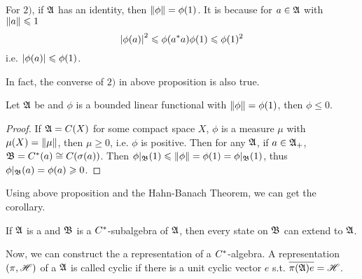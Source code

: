 \documentclass[a4paper,11pt]{report}
\begin{document}
\begin{rem}
	For $2)$, if $\mathfrak{A}$ has an identity, then $\left\lVert\phi\right\lVert = \phi(1)$. It is because for $a \in \mathfrak{A}$ with $\left\lVert a\right\lVert \leqslant 1$
	\begin{equation*}
		\left\lvert\phi(a)\right\lvert^2 \leqslant \phi(a^{*}a)\phi(1) \leqslant \phi(1)^2
	\end{equation*}
	i.e. $\left\lvert\phi(a)\right\lvert \leqslant \phi(1)$.
\end{rem}

In fact, the converse of $2)$ in above proposition is also true.
\begin{prop}
	Let $\mathfrak{A}$ be \Cs and $\phi$ is a bounded linear functional with $\left\lVert\phi\right\lVert = \phi(1)$, then $\phi \leqslant 0$.
\end{prop}
\begin{proof}
	If $\mathfrak{A}=C(X)$ for some compact space $X$, $\phi$ is a measure $\mu$ with $\mu(X)=\left\lVert\mu\right\lVert$, then $\mu \geqslant 0$, i.e. $\phi$ is positive. Then for any $\mathfrak{A}$, if $a \in \mathfrak{A}_{+}$, $\mathfrak{B}=C^{*}(a) \cong C(\sigma(a))$. Then $\phi|_{\mathfrak{B}}(1) \leqslant \left\lVert\phi\right\lVert = \phi(1) = \phi|_{\mathfrak{B}}(1)$, thus $\phi|_{\mathfrak{B}}(a) = \phi(a) \geqslant 0$.
\end{proof}
Using above proposition and the Hahn-Banach Theorem, we can get the corollary.
\begin{cor} \label{cor6}
	If $\mathfrak{A}$ is a \Cs and $\mathfrak{B}$ is a $C^{*}$-subalgebra of $\mathfrak{A}$, then every state on $\mathfrak{B}$ can extend to $\mathfrak{A}$.
\end{cor}	

Now, we can construct the a representation of a $C^{*}$-algebra. A representation $(\pi,\mathscr{H})$ of a \Cs $\mathfrak{A}$ is called cyclic if there is a unit cyclic vector $e$ s.t. $\overline{\pi(\mathfrak{A})e} = \mathscr{H}$.
\end{document}
